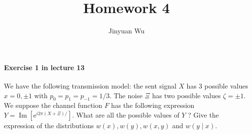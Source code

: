 \documentclass[hyperref, a4paper]{article}
\title{Homework 4}
\author{Jinyuan Wu}
\begin{document}
\maketitle

\paragraph{Exercise 1 in lecture 13} We have the following transmission model: the sent signal $X$ has 3 possible values $x=0, \pm 1$ with $p_0=p_1=p_{-1}=1 / 3$. The noise $\Xi$ has two possible values $\zeta=\pm 1$. We suppose the channel function $F$ has the following expression $Y=\operatorname{Im}\left[\mathrm{e}^{i 2 \pi(X+\Xi) / }\right]$. What are all the possible values of $Y$ ? Give the expression of the distributions $w(x), w(y), w(x, y)$ and $w(y \mid x)$.
\end{document}
